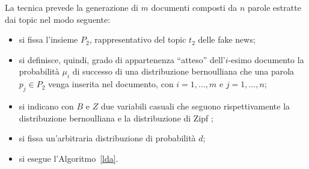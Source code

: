 \documentclass[12pt]{report}
\theoremstyle{definition}
\begin{document}
La tecnica prevede la generazione di $m$ documenti composti da $n$ parole estratte dai topic nel modo seguente: 
\begin{itemize}
    \item si fissa l'insieme $P_2$, rappresentativo del topic $t_2$ delle fake news;
    \item si definisce, quindi, grado di appartenenza ``atteso'' dell'$i$-esimo documento la probabilità $\mu_i$ di successo di una distribuzione bernoulliana che una parola $p_j \in P_2$ venga inserita nel documento, con $i=1, ..., m$ e $j=1, ..., n$;
    \item si indicano con $B$ e $Z$ due variabili casuali che seguono rispettivamente la distribuzione bernoulliana e la distribuzione di Zipf \cite{34};
    \item si fissa un'arbitraria distribuzione di probabilità $d$;
    \item si esegue l'Algoritmo~\ref{lda}.
\end{itemize}  
\end{document}
